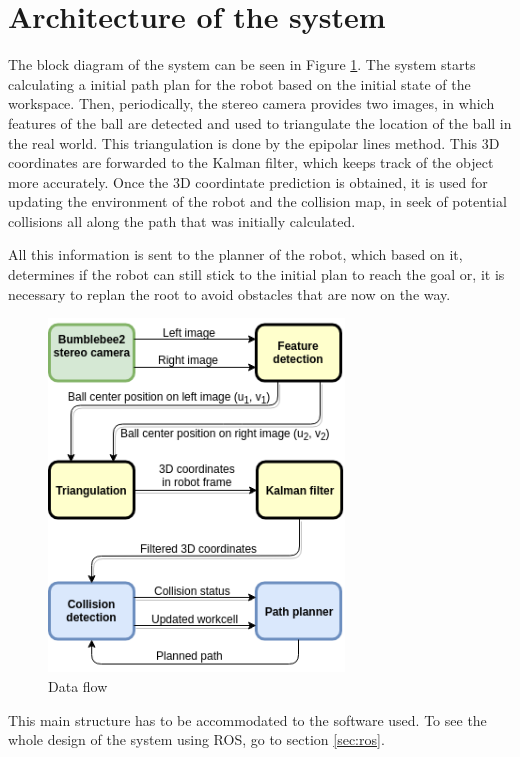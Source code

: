 \newpage
\section{Architecture of the system}
\label{sec:arch}
The block diagram of the system can be seen in Figure \ref{fig:arch}. The system starts calculating a initial path plan for the robot based on the initial state of the workspace. Then, periodically, the stereo camera provides two images, in which features of the ball are detected and used to triangulate the location of the ball in the real world. This triangulation is done by the epipolar lines method. This 3D coordinates are forwarded to the Kalman filter, which keeps track of the object more accurately. Once the 3D coordintate prediction is obtained, it is used for updating the environment of the robot and the collision map, in seek of potential collisions all along the path that was initially calculated.

All this information is sent to the planner of the robot, which based on it, determines if the robot can still stick to the initial plan to reach the goal or, it is necessary to replan the root to avoid obstacles that are now on the way.
\begin{figure}[H]
    \centering
    \includegraphics[width=0.7\textwidth]{Images/arch.png}
    \caption{Data flow}
    \label{fig:arch}
\end{figure}

This main structure has to be accommodated to the software used. To see the whole design of the system using ROS, go to section \ref{sec:ros}.